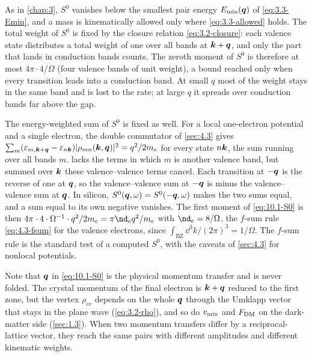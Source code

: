 As in \cref{chap:3}, $S^0$ vanishes below the smallest pair energy $E_{\mathrm{min}}(\bm{q})$ of \cref{eq:3.3-Emin}, and a mass is kinematically allowed only where \cref{eq:3.3-allowed} holds. The total weight of $S^0$ is fixed by the closure relation \cref{eq:3.2-closure}: each valence state distributes a total weight of one over all bands at $\bm{k}+\bm{q}$, and only the part that lands in conduction bands counts. The zeroth moment of $S^0$ is therefore at most $4\pi\cdot4/\Omega$ (four valence bands of unit weight), a bound reached only when every transition leads into a conduction band. At small $q$ most of the weight stays in the same band and is lost to the rate; at large $q$ it spreads over conduction bands far above the gap.

The energy-weighted sum of $S^0$ is fixed as well. For a local one-electron potential and a single electron, the double commutator of \cref{sec:4.3} gives $\sum_m(\varepsilon_{m,\bm{k}+\bm{q}} - \varepsilon_{n\bm{k}})|\rho_{mn}(\bm{k},\bm{q})|^2 = q^2/2m_e$ for every state $n\bm{k}$, the sum running over all bands $m$.  lacks the terms in which $m$ is another valence band, but summed over $\bm{k}$ these valence--valence terms cancel. Each transition at $-\bm{q}$ is the reverse of one at $\bm{q}$, so the valence--valence sum at $-\bm{q}$ is minus the valence--valence sum at $\bm{q}$. In silicon, $S^0(\bm{q},\omega) = S^0(-\bm{q},\omega)$ makes the two sums equal, and a sum equal to its own negative vanishes. The first moment of \cref{eq:10.1-S0} is then $4\pi\cdot4\cdot\Omega^{-1}\cdot q^2/2m_e = \pi\nd_eq^2/m_e$ with $\nd_e = 8/\Omega$, the $f$-sum rule \cref{eq:4.3-fsum} for the valence electrons, since $\int_{\mathrm{BZ}}\dd^3k/(2\pi)^3 = 1/\Omega$. The $f$-sum rule is the standard test of a computed $S^0$, with the caveats of \cref{sec:4.3} for nonlocal potentials.

Note that $\bm{q}$ in \cref{eq:10.1-S0} is the physical momentum transfer and is never folded. The crystal momentum of the final electron is $\bm{k} + \bm{q}$ reduced to the first zone, but the vertex $\rho_{cv}$ depends on the whole $\bm{q}$ through the Umklapp vector that stays in the plane wave (\cref{eq:3.2-rho}), and so do $v_{\mathrm{min}}$ and $F_{\mathrm{DM}}$ on the dark-matter side (\cref{sec:1.3}). When two momentum transfers differ by a reciprocal-lattice vector, they reach the same pairs with different amplitudes and different kinematic weights.

